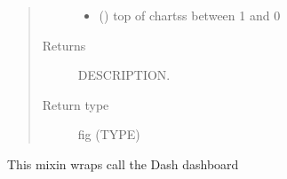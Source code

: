 \documentclass[letterpaper,10pt,english]{sphinxmanual}
\begin{document}
\begin{fulllineitems}
\begin{fulllineitems}
\begin{quote}
\begin{description}
\begin{itemize}
\item {} 
\sphinxAtStartPar
{} (\sphinxstyleliteralemphasis{\sphinxupquote{,}}) \textendash{} top of chartss between 1 and 0

\end{itemize}

\item[{Returns}] \leavevmode
\sphinxAtStartPar
DESCRIPTION.

\item[{Return type}] \leavevmode
\sphinxAtStartPar
fig (TYPE)

\end{description}\end{quote}

\end{fulllineitems}


\end{fulllineitems}


\begin{fulllineitems}
\label{\detokenize{index:modelclass.Dash_Mixin}}
\pysigstartsignatures
{}
\pysigstopsignatures
\sphinxAtStartPar
This mixin wraps call the Dash dashboard

\end{fulllineitems}

\end{document}
